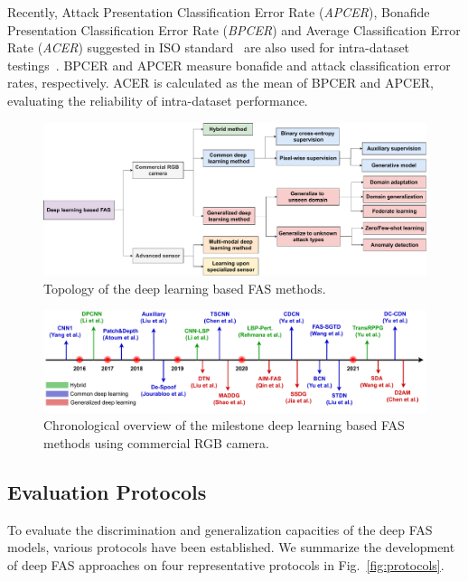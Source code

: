 \documentclass[10pt,journal,compsoc]{IEEEtran}
\begin{document}
Recently, Attack Presentation Classification Error Rate (\textit{APCER}), Bonafide Presentation Classification Error Rate (\textit{BPCER}) and Average Classification Error Rate (\textit{ACER}) suggested in ISO standard~\cite{iso2017information} are also used for intra-dataset testings~\cite{Boulkenafet2017OULU,Liu2018Learning}. BPCER and APCER measure bonafide and attack classification error rates, respectively. ACER is calculated as the mean of BPCER and APCER, evaluating the reliability of intra-dataset performance. 




\begin{figure}
\centering
\includegraphics[scale=0.43]{Figures/topology.pdf}
  \caption{ 
  Topology of the deep learning based FAS methods.
  }
\label{fig:topology}
\end{figure}


\begin{figure}
\centering
\includegraphics[scale=0.46]{Figures/milestone.pdf}
  \caption{ 
  Chronological overview of the milestone deep learning based FAS methods using commercial RGB camera.
  }
\label{fig:milestone}
\end{figure}



\subsection{Evaluation Protocols}
\label{sec:protocols}



To evaluate the discrimination and generalization capacities of the deep FAS models, various protocols have been established. We summarize the development of deep FAS approaches on four representative protocols in Fig.~\ref{fig:protocols}.
\end{document}
